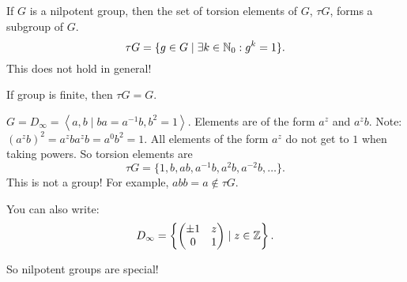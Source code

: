 \begin{theorem}[16.2.7]
    If $G$ is a nilpotent group, then the set of torsion elements of  $G$, $\tau G$, forms a subgroup of  $G$.
    \[
    \tau G = \{g \in G  \mid  \exists  k \in \mathbb{N}_0 : g^{k} = 1\} 
    .\] 
    This does not hold in general!
\end{theorem}

If group is finite, then $\tau G = G$.
\begin{eg}
    $G = D_{\infty} = \left<a, b  \mid  ba  = a^{-1} b, b^2 = 1 \right>$.
    Elements are of the form $a^{z}$ and $a^{z}b$.
    Note: $(a^{z}b)^2 = a^{z} b a^{z} b = a^{0} b^2 = 1$.
    All elements of the form $a^{z}$ do not get to $1$ when taking powers.
    So torsion elements are
     \[
    \tau G = \{1, b, ab, a^{-1}b, a^2b, a^{-2}b, \ldots \} 
    .\] 
    This is not a group!  For example, $ab b = a \not\in  \tau G$.

    You can also write:
    \[
    D_{\infty} = \left\{ \begin{pmatrix}
        \pm 1 & z \\
        0 & 1
    \end{pmatrix}  \mid z \in \mathbb{Z}\right\} 
    .\] 
\end{eg}

So nilpotent groups are special!

